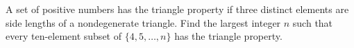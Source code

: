A set of positive numbers has the triangle property if three distinct elements are side lengths of a nondegenerate triangle. Find the largest integer $n$ such that every ten-element subset of $\{4,5,\ldots,n\}$ has the triangle property.
